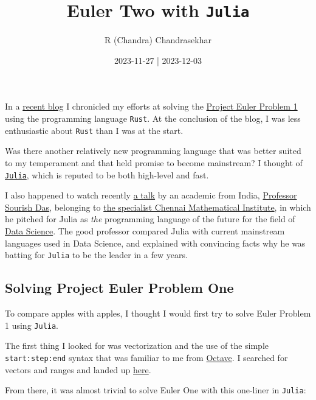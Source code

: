 \documentclass[
  a4paper,
]{article}
\title{Euler Two with \texttt{Julia}}
\author{R (Chandra) Chandrasekhar}
\date{2023-11-27 | 2023-12-03}
\begin{document}
\maketitle

\thispagestyle{empty}


In a
\href{https://swanlotus.netlify.app/blogs/a-foray-into-rust-euler-one}{recent
blog} I chronicled my efforts at solving the
\href{https://projecteuler.net/problem=1}{Project Euler Problem 1} using
the programming language \texttt{Rust}. At the conclusion of the blog, I
was less enthusiastic about \texttt{Rust} than I was at the start.

Was there another relatively new programming language that was better
suited to my temperament and that held promise to become mainstream? I
thought of \href{https://julialang.org/}{\texttt{Julia}}, which is
reputed to be both high-level and fast.

I also happened to watch recently
\href{https://www.youtube.com/watch?v=rgcwvrGGFww}{a talk} by an
academic from India,
\href{https://www.cmi.ac.in/people/fac-profile.php?id=sourish}{Professor
Sourish Das}, belonging to \href{https://www.cmi.ac.in/}{the specialist
Chennai Mathematical Institute}, in which he pitched for Julia as
\emph{the} programming language of the future for the field of
\href{https://en.wikipedia.org/wiki/Data_science}{Data Science}. The
good professor compared Julia with current mainstream languages used in
Data Science, and explained with convincing facts why he was batting for
\texttt{Julia} to be the leader in a few years.

\hypertarget{solving-project-euler-problem-one}{%
\subsection{Solving Project Euler Problem
One}\label{solving-project-euler-problem-one}}

To compare apples with apples, I thought I would first try to solve
Euler Problem 1 using \texttt{Julia}.

The first thing I looked for was vectorization and the use of the simple
\texttt{start:step:end} syntax that was familiar to me from
\href{https://octave.org/}{Octave}. I searched for vectors and ranges
and landed up
\href{https://docs.juliahub.com/CalculusWithJulia/AZHbv/0.0.5/precalc/ranges.html}{here}.

From there, it was almost trivial to solve Euler One with this one-liner
in \texttt{Julia}:
\end{document}
